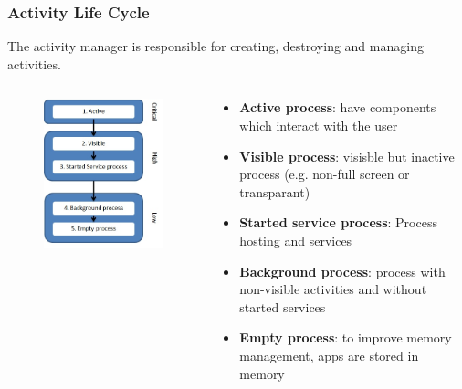 \documentclass{beamer}
\begin{document}
\begin{frame}
	\frametitle{Activity Life Cycle}
	The \textcolor{HoGentAccent6}{activity manager} is responsible for creating, destroying and managing activities. 
		\begin{columns}
			\begin{column}{0.4 \textwidth}
			
				\begin{figure}
					\centering
						\includegraphics[width=\textwidth]{img/actState.jpg}
				\end{figure}
			
	\end{column}
	
	\begin{column}{0.6 \textwidth}
			
			\begin{itemize}
				\item \textbf{Active process}: have components which interact with the user
				\item \textbf{Visible process}: visisble but inactive process (e.g. non-full screen or transparant)
				\item \textbf{Started service process}: Process hosting and services
				\item \textbf{Background process}: process with non-visible activities and without started services
				\item \textbf{Empty process}: to improve memory management, apps are stored in memory 
			\end{itemize}
	\end{column}
	\end{columns}
\end{frame}
\end{document}
